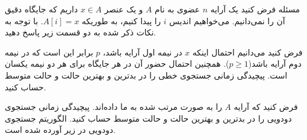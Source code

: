 ‌مسئله
فرض کنید یک آرایه $n$ عضوی به نام $A$ و یک عنصر
 $x \in A$
  داریم که جایگاه دقیق آن را نمی‌دانیم. می‌خواهیم اندیس $i$ را پیدا کنیم، به طوریکه
  $A[i] = x$. 
با توجه به نکات ذکر شده به دو قسمت زیر پاسخ دهید.
  
فرض کنید می‌دانیم احتمال اینکه $x$ در نیمه اول آرایه باشد، $p$
 برابر این است که در نیمه دوم آرایه باشد($p \geq 1$). همچنین احتمال حضور آن در هر جایگاه برای هر دو نیمه یکسان است. پیچیدگی زمانی جستجوی خطی را در بدترین و بهترین حالت و حالت متوسط حساب کنید.



فرض کنید که آرایه $A$ را به صورت مرتب شده به ما داده‌اند. پیچیدگی زمانی جستجوی دودویی را در بدترین و بهترین حالت و حالت متوسط حساب کنید. الگوریتم جستجوی دودویی در زیر آورده شده است.


